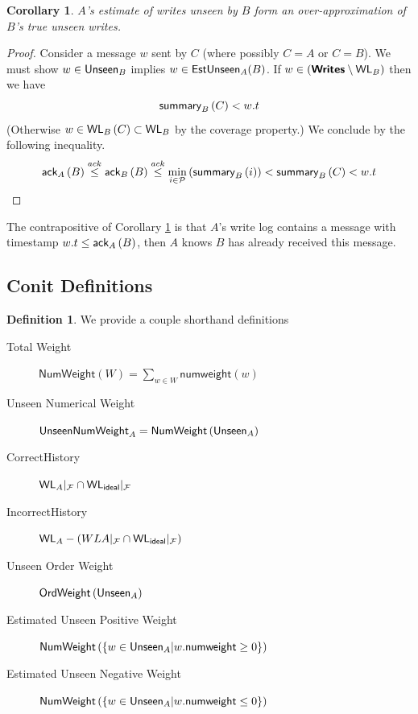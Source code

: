 \documentclass[]             %
{NASA}                       %
\newtheorem{corollary}[theorem]{Corollary}
\theoremstyle{definition}
\newtheorem{definition}[theorem]{Definition}
\begin{document}
\begin{corollary}
  \label{cor:unseenest}
  $A$'s estimate of writes unseen by $B$ form an over-approximation of $B$'s true unseen writes.
\end{corollary}
\begin{proof}
  Consider a message $w$ sent by $C$ (where possibly $C = A$ or $C = B$). We must show
  $w \in \textsf{Unseen}_{B}$ implies $w \in \textsf{EstUnseen}_{A}{\left(B\right)}$.  If $w \in \left(\textbf{\textsf{Writes}} \setminus \textsf{WL}_{B}\right)$ then we have
  \[ \textsf{summary}_{B}\left(C\right) < w.t\]
  (Otherwise $w \in \textsf{WL}_{B}\left(C\right) \subset \textsf{WL}_{B}$ by the coverage property.)
  We conclude by the following inequality.
  \[\textsf{ack}_{A}\left(B\right) \overset{ack}{\leq} \textsf{ack}_{B}\left(B\right) \overset{ack}{\leq} \min_{i \in \mathcal{P}} \left(\textsf{summary}_{B}\left(i\right)\right) < \textsf{summary}_{B}\left(C\right) < w.t\]
\end{proof}

The contrapositive of Corollary \ref{cor:unseenest} is that $A$'s
write log contains a message with timestamp $w.t \leq \textsf{ack}_{A}\left(B\right)$,
then $A$ knows $B$ has already received this message.

\subsection{Conit Definitions}


\newcommand{\UnseenWeight}[1]{\textsf{Unseen}_{#1}}
\newcommand{\UnseenWeightEst}[2]{\textsf{EstUnseen}_{#1}{\left(#2\right)}}


\begin{definition}
  We provide a couple shorthand definitions
\begin{description}
  \item[Total Weight] $\textsf{NumWeight}(W) = \sum_{w \in W} \textsf{numweight}{\left(w\right)}$
  \item[Unseen Numerical Weight] $\textsf{UnseenNumWeight}_{A} = \textsf{NumWeight}\left(\textsf{Unseen}_{A}\right)$
  \item[CorrectHistory] $\textsf{WL}_{A}|_{\mathcal{F}} \cap \textsf{WL}_{\mathsf{ideal}}|_{\mathcal{F}}$
  \item[IncorrectHistory] $\textsf{WL}_{A} - \left(WL{A}|_{\mathcal{F}} \cap \textsf{WL}_{\mathsf{ideal}}|_{\mathcal{F}}\right)$
  \item[Unseen Order Weight] $\textsf{OrdWeight}\left(\textsf{Unseen}_{A}\right)$
  \item[Estimated Unseen Positive Weight] $\textsf{NumWeight}\left(\{w \in \textsf{Unseen}_{A} | w.\textsf{numweight} \geq 0 \}\right)$
  \item[Estimated Unseen Negative Weight] $\textsf{NumWeight}\left(\{w \in \textsf{Unseen}_{A} | w.\textsf{numweight} \leq 0 \}\right)$
  \end{description}
\end{definition}
\end{document}

